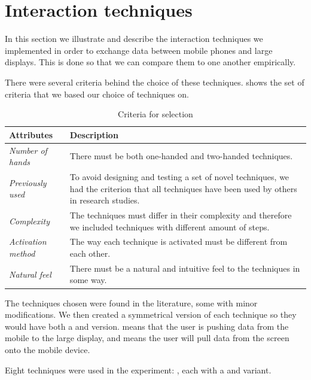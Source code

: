 \section{Interaction techniques} \label{sec:techniques}
In this section we illustrate and describe the interaction techniques we implemented in order to exchange data between mobile phones and large displays.
This is done so that we can compare them to one another empirically.

There were several criteria behind the choice of these techniques. 
 shows the set of criteria that we based our choice of techniques on.

\begin{table}[H]
	\centering
	\def\arraystretch{1.5}
	\begin{tabular}{p{} p{}}
		\hline
		\textbf{Attributes} & \textbf{Description} \\ \hline
		\textit{Number of hands} & There must be both one-handed and two-handed techniques. \\ \hline
		\textit{Previously used} & To avoid designing and testing a set of novel techniques, we had the criterion that all techniques have been used by others in research studies. \\ \hline
		\textit{Complexity} & The techniques must differ in their complexity and therefore we included techniques with different amount of steps. \\ \hline
		\textit{Activation method} & The way each technique is activated must be different from each other. \\ \hline
		\textit{Natural feel} & There must be a natural and intuitive feel to the techniques in some way. \\ \hline
	\end{tabular}
	\caption{Criteria for selection}
	\label{tab:techniqueCriteria}
\end{table}


The techniques chosen were found in the literature, some with minor modifications.
We then created a symmetrical version of each technique so they would have both a \push and \pull version.
\push means that the user is pushing data from the mobile to the large display, and \pull means the user will pull data from the screen onto the mobile device. 

Eight techniques were used in the experiment: \alltechniques, each with a \push and \pull variant.


